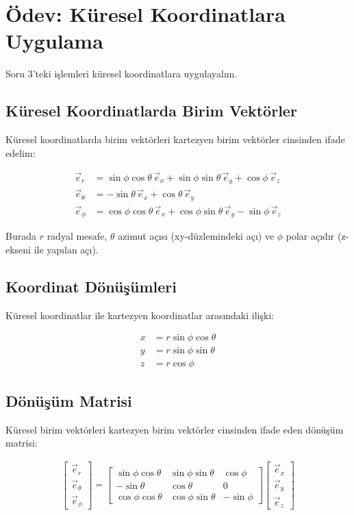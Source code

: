 \documentclass{fenbil}
\begin{document}
\section{Ödev: Küresel Koordinatlara Uygulama}

Soru 3'teki işlemleri küresel koordinatlara uygulayalım.

\subsection{Küresel Koordinatlarda Birim Vektörler}

Küresel koordinatlarda birim vektörleri kartezyen birim vektörler cinsinden ifade edelim:

\begin{align}
\vec{e}_r &= \sin\phi\cos\theta\, \vec{e}_x + \sin\phi\sin\theta\, \vec{e}_y + \cos\phi\, \vec{e}_z \\
\vec{e}_\theta &= -\sin\theta\, \vec{e}_x + \cos\theta\, \vec{e}_y \\
\vec{e}_\phi &= \cos\phi\cos\theta\, \vec{e}_x + \cos\phi\sin\theta\, \vec{e}_y - \sin\phi\, \vec{e}_z
\end{align}

Burada $r$ radyal mesafe, $\theta$ azimut açısı (xy-düzlemindeki açı) ve $\phi$ polar açıdır (z-ekseni ile yapılan açı).

\subsection{Koordinat Dönüşümleri}

Küresel koordinatlar ile kartezyen koordinatlar arasındaki ilişki:

\begin{align}
x &= r \sin\phi \cos\theta \\
y &= r \sin\phi \sin\theta \\
z &= r \cos\phi
\end{align}

\subsection{Dönüşüm Matrisi}

Küresel birim vektörleri kartezyen birim vektörler cinsinden ifade eden dönüşüm matrisi:

\begin{align}
\begin{bmatrix} \vec{e}_r \\ \vec{e}_\theta \\ \vec{e}_\phi \end{bmatrix} = 
\begin{bmatrix} 
\sin\phi\cos\theta & \sin\phi\sin\theta & \cos\phi \\
-\sin\theta & \cos\theta & 0 \\
\cos\phi\cos\theta & \cos\phi\sin\theta & -\sin\phi
\end{bmatrix}
\begin{bmatrix} \vec{e}_x \\ \vec{e}_y \\ \vec{e}_z \end{bmatrix}
\end{align}
\end{document}
